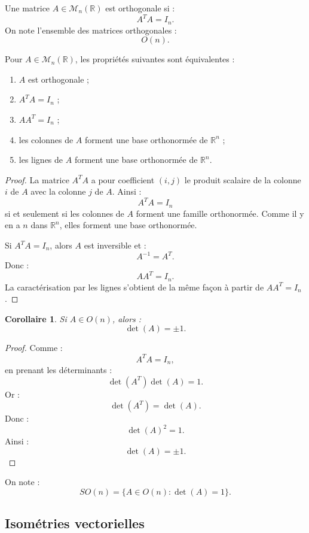 \documentclass[11pt,a4paper]{article}
\newcommand{\R}{\mathbb R}
\newcommand{\M}{\mathcal M}
\newtheorem{corollaire}[prop]{Corollaire}
\begin{document}
\begin{definitionbox}
Une matrice \(A\in\M_n(\R)\) est orthogonale si :
\[
A^TA=I_n.
\]
On note l'ensemble des matrices orthogonales :
\[
O(n).
\]
\end{definitionbox}

\begin{theorembox}[Caractérisations]
Pour \(A\in\M_n(\R)\), les propriétés suivantes sont équivalentes :
\begin{enumerate}
    \item \(A\) est orthogonale ;
    \item \(A^TA=I_n\) ;
    \item \(AA^T=I_n\) ;
    \item les colonnes de \(A\) forment une base orthonormée de \(\R^n\) ;
    \item les lignes de \(A\) forment une base orthonormée de \(\R^n\).
\end{enumerate}
\end{theorembox}

\begin{proof}
La matrice \(A^TA\) a pour coefficient \((i,j)\) le produit scalaire de la colonne \(i\) de \(A\) avec la colonne \(j\) de \(A\).  
Ainsi :
\[
A^TA=I_n
\]
si et seulement si les colonnes de \(A\) forment une famille orthonormée.  
Comme il y en a \(n\) dans \(\R^n\), elles forment une base orthonormée.

Si \(A^TA=I_n\), alors \(A\) est inversible et :
\[
A^{-1}=A^T.
\]
Donc :
\[
AA^T=I_n.
\]
La caractérisation par les lignes s'obtient de la même façon à partir de \(AA^T=I_n\).
\end{proof}

\begin{corollaire}
Si \(A\in O(n)\), alors :
\[
\det(A)=\pm1.
\]
\end{corollaire}

\begin{proof}
Comme :
\[
A^TA=I_n,
\]
en prenant les déterminants :
\[
\det(A^T)\det(A)=1.
\]
Or :
\[
\det(A^T)=\det(A).
\]
Donc :
\[
\det(A)^2=1.
\]
Ainsi :
\[
\det(A)=\pm1.
\]
\end{proof}

\begin{definitionbox}
On note :
\[
SO(n)=\{A\in O(n):\det(A)=1\}.
\]
\end{definitionbox}

\subsection{Isométries vectorielles}
\end{document}
